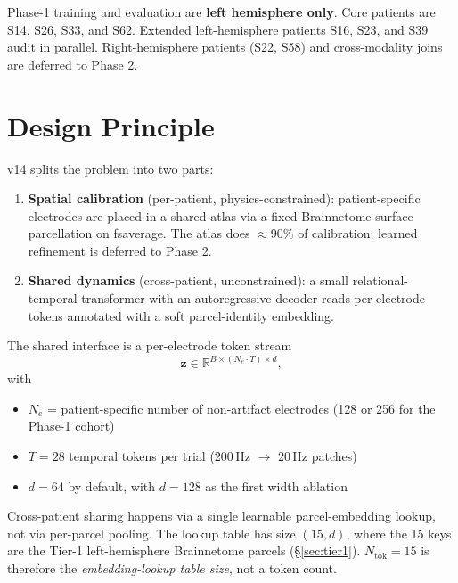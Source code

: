 \documentclass[11pt,letterpaper]{article}
\newcommand{\R}{\mathbb{R}}
\newcommand{\bz}{\mathbf{z}}
\begin{document}
Phase-1 training and evaluation are \textbf{left hemisphere only}. Core patients are S14, S26, S33, and S62. Extended left-hemisphere patients S16, S23, and S39 audit in parallel. Right-hemisphere patients (S22, S58) and cross-modality joins are deferred to Phase 2.


\section{Design Principle}

v14 splits the problem into two parts:
\begin{enumerate}[leftmargin=2em, itemsep=0.2em]
\item \textbf{Spatial calibration} (per-patient, physics-constrained): patient-specific electrodes are placed in a shared atlas via a fixed Brainnetome surface parcellation on fsaverage. The atlas does $\approx 90\%$ of calibration; learned refinement is deferred to Phase 2.
\item \textbf{Shared dynamics} (cross-patient, unconstrained): a small relational-temporal transformer with an autoregressive decoder reads per-electrode tokens annotated with a soft parcel-identity embedding.
\end{enumerate}

The shared interface is a per-electrode token stream
\begin{equation}
\bz \in \R^{B \times (N_e \cdot T) \times d},
\end{equation}
with
\begin{itemize}[leftmargin=2em, itemsep=0.2em]
\item $N_e$ = patient-specific number of non-artifact electrodes (128 or 256 for the Phase-1 cohort)
\item $T = 28$ temporal tokens per trial (200\,Hz $\rightarrow$ 20\,Hz patches)
\item $d = 64$ by default, with $d=128$ as the first width ablation
\end{itemize}

Cross-patient sharing happens via a single learnable parcel-embedding lookup, not via per-parcel pooling. The lookup table has size $(15, d)$, where the 15 keys are the Tier-1 left-hemisphere Brainnetome parcels (\S\ref{sec:tier1}). $N_{\text{tok}} = 15$ is therefore the \emph{embedding-lookup table size}, not a token count.
\end{document}
